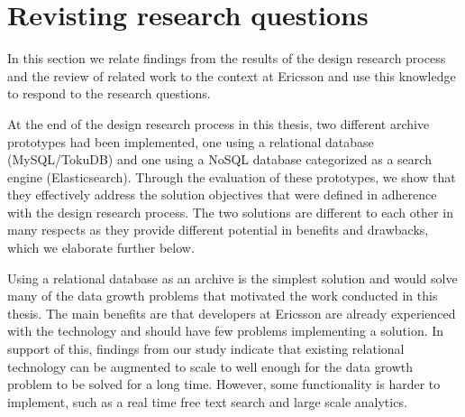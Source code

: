 



\section{Revisting research questions}
In this section we relate findings from the results of the design research process and the review of related work to the context at Ericsson and use this knowledge to respond to the research questions.

At the end of the design research process in this thesis, two different archive prototypes had been implemented, one using a relational database (MySQL/TokuDB) and one using a NoSQL database categorized as a search engine (Elasticsearch). Through the evaluation of these prototypes, we show that they effectively address the solution objectives that were defined in adherence with the design research process. The two solutions are different to each other in many respects as they provide different potential in benefits and drawbacks, which we elaborate further below.

Using a relational database as an archive is the simplest solution and would solve many of the data growth problems that motivated the work conducted in this thesis. The main benefits are that developers at Ericsson are already experienced with the technology and should have few problems implementing a solution. In support of this, findings from our study indicate that existing relational technology can be augmented to scale to well enough for the data growth problem to be solved for a long time. However, some functionality is harder to implement, such as a real time free text search and large scale analytics.

